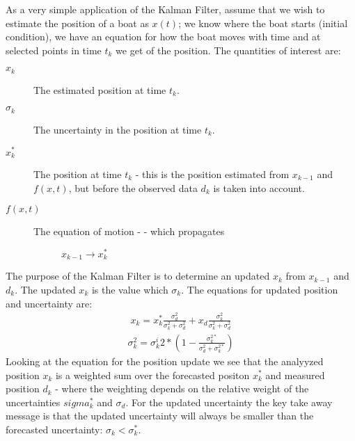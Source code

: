 \documentclass[a4paper,10pt,english]{sphinxmanual}
\begin{document}
As a very simple application of the Kalman Filter, assume that we wish to
estimate the position of a boat as \(x(t)\); we know where the boat starts
(initial condition), we have an equation for how the boat moves with time and at
selected points in time \(t_k\) we get  of the position. The
quantities of interest are:
\begin{description}
\item[{\(x_k\)}] \leavevmode
The estimated position at time \(t_k\).

\item[{\(\sigma_k\)}] \leavevmode
The uncertainty in the position at time \(t_k\).

\item[{\(x_k^{\ast}\)}] \leavevmode
The  position at time \(t_k\) -
this is the position estimated from \(x_{k-1}\) and \(f(x,t)\), but
before the observed data \(d_k\) is taken into account.

\item[{\(f(x,t)\)}] \leavevmode\begin{description}
\item[{The equation of motion -  - which propagates}] \leavevmode
\(x_{k-1} \to x_k^{\ast}\)

\end{description}

\end{description}

The purpose of the Kalman Filter is to determine an updated \(x_k\) from
\(x_{k-1}\) and \(d_k\). The updated \(x_k\) is the value which
 \(\sigma_k\). The equations for updated position
and uncertainty are:
\begin{equation*}
\begin{split}x_k = x_k^{\ast}\frac{\sigma_d^2}{\sigma_k^2 + \sigma_d^2} + x_d
\frac{\sigma_k^2}{\sigma_k^2 + \sigma_d^2}\end{split}
\end{equation*}\begin{equation*}
\begin{split}\sigma_k^2 = \sigma_k^i{2\ast}\left(1 - \frac{\sigma_k^{2\ast}}{\sigma_d^2 + \sigma_k^{2\ast}}\right)\end{split}
\end{equation*}
Looking at the equation for the position update we see that the analyyzed
position \(x_k\) is a weighted sum over the forecasted positon
\(x_k^{\ast}\) and measured position \(d_k\) - where the weighting
depends on the relative weight of the uncertainties \(sigma_k^{\ast}\) and
\(\sigma_d\). For the updated uncertainty the key take away message is that
the updated uncertainty will always be smaller than the forecasted uncertainty:
\(\sigma_k < \sigma_k^{\ast}\).
\end{document}

